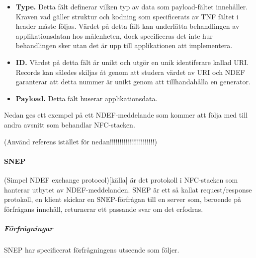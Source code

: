 \documentclass[11pt]{article}
\begin{document}
\begin{itemize}
\item \textbf{Type.} Detta fält definerar vilken typ av data som payload-fältet innehåller. Kraven vad gäller struktur och kodning som specificerats av TNF fältet i header måste följas. Värdet på detta fält kan underlätta behandlingen av applikationsdatan hos målenheten, dock specificeras det inte hur behandlingen sker utan det är upp till applikationen att implementera.
\item \textbf{ID.} Värdet på detta fält är unikt och utgör en unik identiferare kallad URI. Records kan således skiljas åt genom att studera värdet av URI och NDEF garanterar att detta nummer är unikt genom att tillhandahålla en generator.
\item \textbf{Payload.} Detta fält huserar applikationsdata.
\end{itemize}
Nedan ges ett exempel på ett NDEF-meddelande som kommer att följa med till andra avsnitt som behandlar NFC-stacken.

(Använd referens istället för nedan!!!!!!!!!!!!!!!!!!!!!!!)


\paragraph{SNEP} 
(Simpel NDEF exchange protocol)[källa] är det protokoll i NFC-stacken som hanterar utbytet av NDEF-meddelanden. SNEP är ett så kallat request/response protokoll, en klient skickar en SNEP-förfrågan till en server som, beroende på förfrågans innehåll, returnerar ett passande svar om det erfodras.

\subparagraph{Förfrågningar}
SNEP har specificerat förfrågningens utseende som följer.

\end{document}
